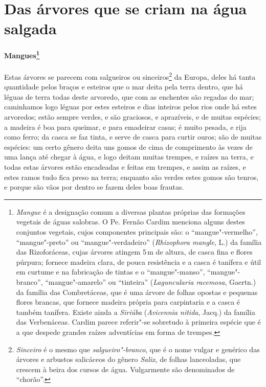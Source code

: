\section{Das árvores que se criam na água salgada}
\paragraph{Mangues\footnote{ \textit{Mangue} é a designação
comum a diversas plantas próprias das formações vegetais de águas
salobras. O Pe. Fernão Cardim menciona alguns destes conjuntos
vegetais, cujos componentes principais são: o ``mangue"-vermelho'', 
``mangue"-preto'' ou ``mangue"-verdadeiro'' (\textit{Rhizophora mangle}, L.)
da família das Rizoforáceas, cujas árvores atingem 5\,m de altura, de
casca fina e flores púrpura; fornece madeira clara, de pouca
resistência e a casca é tanífera e útil em curtume e na fabricação de
tintas e o ``mangue"-manso'', ``mangue"-branco'', ``mangue"-amarelo'' ou
``tinteira'' (\textit{Laguncularia racemosa}, Gaertn.) da família das
Combretáceas, que é uma árvore de folhas opostas e pequenas flores
brancas, que fornece madeira própria para carpintaria e a casca é
também tanífera. Existe ainda a \textit{Siriúba} (\textit{Avicennia
nitida}, Jacq.) da família das Verbenáceas. Cardim parece referir"-se
sobretudo à primeira espécie que é a que despede grandes raízes
adventícias em forma de trempes.}} Estas árvores se parecem
com salgueiros ou sinceiros\footnote{ \textit{Sinceiro} é o mesmo que
\textit{salgueiro"-branco}, que é o nome vulgar e genérico das árvores e
arbustos salicáceos do gênero \textit{Salix}, de folhas lanceoladas,
que crescem à beira dos cursos de água. Vulgarmente são denominados de
``chorão''.} da Europa, deles há tanta quantidade pelos braços e esteiros
que o mar deita pela terra dentro, que há léguas de terra todas deste
arvoredo, que com as enchentes são regadas do mar; caminhamos logo
léguas por estes esteiros e dias inteiros pelos rios onde há estes
arvoredos; estão sempre verdes, e são graciosos, e aprazíveis, e de
muitas espécies; a madeira é boa para queimar, e para emadeirar casas;
é muito pesada, e rija como ferro; da casca se faz tinta, e serve de
casca para curtir ouros; são de muitas espécies: um certo gênero deita
uns gomos de cima de comprimento às vezes de uma lança até chegar à
água, e logo deitam muitas trempes, e raízes na terra, e todas estas
árvores estão encadeadas e feitas em trempes, e assim as raízes, e
estes ramos tudo fica preso na terra; enquanto são verdes estes gomos
são tenros, e porque são vãos por dentro se fazem deles boas frautas.

